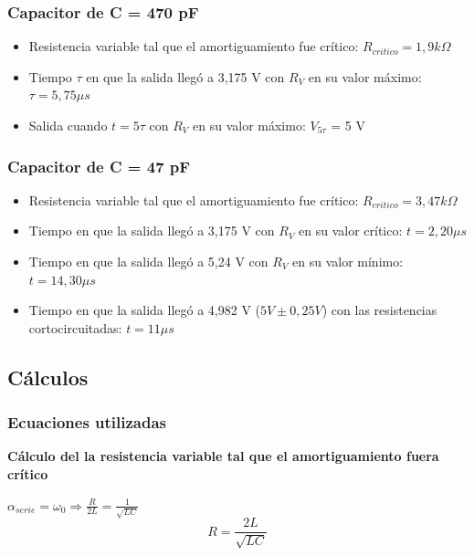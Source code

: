 \documentclass{article}
\begin{document}
        \subsubsection*{Capacitor de C = 470 pF}
            \begin{itemize}
                \item Resistencia variable tal que el amortiguamiento fue crítico: $ R_{critico} = 1,9 k\Omega $ %
                \item Tiempo $\tau$ en que la salida llegó a 3,175 V con $ R_V $ en su valor máximo: $ \tau = 5,75 \mu s$ %
                \item Salida cuando $t=5\tau$ con $ R_V $ en su valor máximo: $V_{5\tau}$ = 5 V%
            \end{itemize}

        \par
        \subsubsection*{Capacitor de C = 47 pF}
            \begin{itemize}
                \item Resistencia variable tal que el amortiguamiento fue crítico: $ R_{critico} = 3,47 k\Omega $ %
                \item Tiempo en que la salida llegó a 3,175 V con $ R_V $ en su valor crítico: $ t = 2,20 \mu s$ %
                \item Tiempo en que la salida llegó a 5,24 V con $ R_V $ en su valor mínimo: $ t = 14,30 \mu s$ %
                \item Tiempo en que la salida llegó a 4,982 V ($ 5V \pm 0,25V $) con las resistencias cortocircuitadas: $ t = 11 \mu s$ %
            \end{itemize}

    \subsection{Cálculos}

        \subsubsection*{Ecuaciones utilizadas}            

            \textbf{Cálculo del la resistencia variable tal que el amortiguamiento fuera crítico} \par \par
            $ \alpha_{serie} = \omega_0 \Rightarrow \frac{R}{2L} = \frac{1}{\sqrt{LC}}  $
            \begin{equation}
                R = \frac{2L}{\sqrt{LC}}
            \end{equation}  \par \par 
\end{document}
